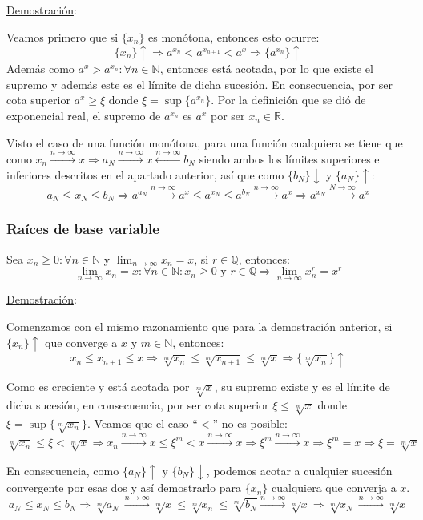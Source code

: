 \documentclass[10pt,a4paper,openright]{book}
\theoremstyle{break}
\begin{document}
\underline{Demostración}:\par
Veamos primero que si $\{x_n\}$ es monótona, entonces esto ocurre:
$$\{x_n\}\uparrow\Rightarrow a^{x_n}<a^{x_{n+1}}<a^x \Rightarrow \{a^{x_n}\} \uparrow$$
Además como $a^x>a^{x_n}:\forall n\in \mathbb N$, entonces está acotada, por lo que existe el supremo y además este es el límite de dicha sucesión. En consecuencia, por ser cota superior $a^x\geq \xi$ donde $\xi=\sup\{a^{x_n}\}$. Por la definición que se dió de exponencial real, el supremo de $a^{x_n}$ es $a^x$ por ser $x_n\in \mathbb R$.

Visto el caso de una función monótona, para una función cualquiera se tiene que como $x_n\xrightarrow{n\rightarrow\infty} x\Rightarrow a_N\xrightarrow{n\rightarrow\infty}x\xleftarrow{n\rightarrow\infty} b_N$ siendo ambos los límites superiores e inferiores descritos en el apartado anterior, así que como $\{b_N\}\downarrow$ y $\{a_N\}\uparrow$:
$$a_N\leq x_N\leq b_N \Rightarrow a^{a_N}\xrightarrow{n\rightarrow\infty}a^x\leq a^{x_N}\leq a^{b_N}\xrightarrow{n\rightarrow\infty}a^x\Rightarrow a^{x_N}\xrightarrow{N\rightarrow\infty}a^x$$

\subsubsection{Raíces de base variable}
Sea $x_n\geq 0: \forall n\in \mathbb N$ y $\lim_{n\rightarrow\infty} x_n = x$, si $r\in \mathbb Q$, entonces:
$$\lim_{n\rightarrow \infty}x_n = x: \forall n\in \mathbb N: x_n\geq 0 \mbox{ y }r\in \mathbb Q\Rightarrow \lim_{n\rightarrow\infty}x_n^{r} = x^r$$

\underline{Demostración}:\par
Comenzamos con el mismo razonamiento que para la demostración anterior, si $\{x_n\}\uparrow$ que converge a $x$ y $m\in \mathbb N$, entonces:
$$x_n\leq x_{n+1}\leq x\Rightarrow \sqrt[m]{x_n}\leq \sqrt[m]{x_{n+1}}\leq \sqrt[m]{x} \Rightarrow \{\sqrt[m]{x_n}\}\uparrow$$

Como es creciente y está acotada por $\sqrt[m]{x}$, su supremo existe y es el límite de dicha sucesión, en consecuencia, por ser cota superior $\xi\leq \sqrt[m]{x}$ donde $\xi=\sup\{\sqrt[m]{x_n}\}$. Veamos que el caso ``$<$'' no es posible:
$$\sqrt[m]{x_n}\leq \xi< \sqrt[m]{x}\Rightarrow x_n\xrightarrow{n\rightarrow\infty}x\leq \xi^m<x\xrightarrow{n\rightarrow\infty}x\Rightarrow \xi^m\xrightarrow{n\rightarrow\infty}x\Rightarrow \xi^m=x\Rightarrow \xi=\sqrt[m]{x}$$

En consecuencia, como $\{a_N\}\uparrow$ y $\{b_N\}\downarrow$, podemos acotar a cualquier sucesión convergente por esas dos y así demostrarlo para $\{x_n\}$ cualquiera que converja a $x$.
$$a_N\leq x_N\leq b_N\Rightarrow \sqrt[m]{a_N}\xrightarrow{n\rightarrow\infty}\sqrt[m]{x}\leq \sqrt[m]{x_n}\leq \sqrt[m]{b_N}\xrightarrow{n\rightarrow\infty}\sqrt[m]{x}\Rightarrow \sqrt[m]{x_N}\xrightarrow{n\rightarrow\infty}\sqrt[m]{x}$$
\end{document}
